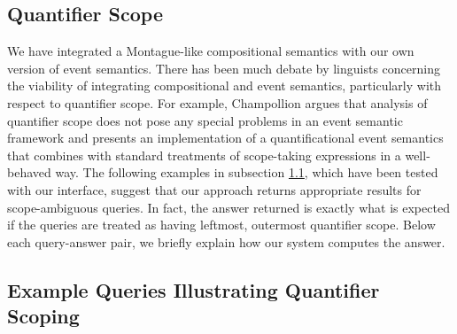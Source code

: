 \documentclass[../main.tex]{subfiles}
\begin{document}
\begin{refsection}
\section{Quantifier Scope}
\label{ext:quantifierscope}

We have integrated a Montague-like \cite{Dowty:wall} compositional semantics with our own
version of event semantics. There has been much debate by linguists concerning the viability of integrating
compositional and event semantics, particularly with respect to quantifier scope. For example, Champollion
\cite{champollion2015interaction} argues that analysis of quantifier scope does not pose any special problems in
an event semantic framework and presents an implementation of a quantificational event semantics that
combines with standard treatments of scope-taking expressions in a well-behaved way.
The following examples in subsection \ref{ext:examplequeries}, which have been tested with our interface, suggest that our approach
returns appropriate results for scope-ambiguous queries. In fact, the answer returned is exactly what is
expected if the queries are treated as having leftmost, outermost quantifier scope. Below each query-answer pair, we briefly explain how our system computes the answer.

\subsection{Example Queries Illustrating Quantifier Scoping}
\label{ext:examplequeries}


\end{refsection}
\end{document}
